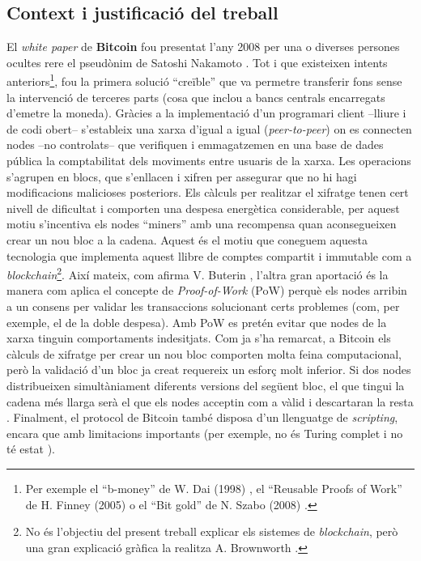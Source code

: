 \documentclass[11pt,a4paper]{article}
\begin{document}
\subsection{Context i justificació del treball}
\label{sub:context}
El \textit{white paper} de \textbf{Bitcoin} fou presentat l'any 2008 per una o diverses persones ocultes rere el pseudònim de Satoshi Nakamoto \cite{nakamoto2008}. Tot i que existeixen intents anteriors\footnote{Per exemple el ``b-money'' de W. Dai (1998) \cite{dai1998}, el ``Reusable Proofs of Work'' de H. Finney (2005) \cite{finney2005} o el ``Bit gold'' de N. Szabo (2008) \cite{szabo2008}.}, fou la primera solució ``creïble'' \cite{vuterin2014} que va permetre transferir fons sense la intervenció de terceres parts (cosa que inclou a bancs centrals encarregats d'emetre la moneda). Gràcies a la implementació d'un programari client –lliure i de codi obert– s'estableix una xarxa d'igual a igual (\textit{peer-to-peer}) on es connecten nodes –no controlats– que verifiquen i emmagatzemen en una base de dades pública la comptabilitat dels moviments entre usuaris de la xarxa. Les operacions s'agrupen en blocs, que s'enllacen i xifren per assegurar que no hi hagi modificacions malicioses posteriors. Els càlculs per realitzar el xifratge tenen cert nivell de dificultat i comporten una despesa energètica considerable, per aquest motiu s'incentiva els nodes ``miners'' amb una recompensa quan aconsegueixen crear un nou bloc a la cadena. Aquest és el motiu que coneguem aquesta tecnologia que implementa aquest llibre de comptes compartit i immutable com a \textit{blockchain}\footnote{No és l'objectiu del present treball explicar els sistemes de \textit{blockchain}, però una gran explicació gràfica la realitza A. Brownworth \cite{brownworth1}\cite{brownworth2}.}. Així mateix, com afirma V. Buterin \cite{vuterin2014}, l'altra gran aportació és la manera com aplica el concepte de \textit{Proof-of-Work} (PoW) perquè els nodes arribin a un consens per validar les transaccions solucionant certs problemes (com, per exemple, el de la doble despesa). Amb PoW es pretén evitar que nodes de la xarxa tinguin comportaments indesitjats. Com ja s'ha remarcat, a Bitcoin els càlculs de xifratge per crear un nou bloc comporten molta feina computacional, però la validació d'un bloc ja creat requereix un esforç molt inferior. Si dos nodes distribueixen simultàniament diferents versions del següent bloc, el que tingui la cadena més llarga serà el que els nodes acceptin com a vàlid i descartaran la resta \cite{nakamoto2008}. Finalment, el protocol de Bitcoin també disposa d'un llenguatge de \textit{scripting}, encara que amb limitacions importants (per exemple, no és Turing complet i no té estat \cite{vuterin2014}). 
\end{document}
